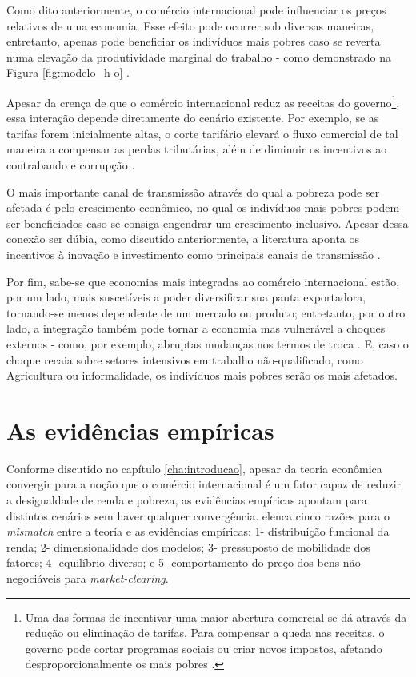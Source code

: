 Como dito anteriormente, o comércio internacional pode influenciar os preços relativos de uma economia. Esse efeito pode ocorrer sob diversas maneiras, entretanto, apenas pode beneficiar os indivíduos mais pobres caso se reverta numa elevação da produtividade marginal do trabalho - como demonstrado na Figura \ref{fig:modelo_h-o} \cite{bannisterthugge01}.

Apesar da crença de que o comércio internacional reduz as receitas do governo\footnote{Uma das formas de incentivar uma maior abertura comercial se dá através da redução ou eliminação de tarifas. Para compensar a queda nas receitas, o governo pode cortar programas sociais ou criar novos impostos, afetando desproporcionalmente os mais pobres \cite{bannisterthugge01}.}, essa interação depende diretamente do cenário existente. Por exemplo, se as tarifas forem inicialmente altas, o corte tarifário elevará o fluxo comercial de tal maneira a compensar as perdas tributárias, além de diminuir os incentivos ao contrabando e corrupção \cite{bannisterthugge01}.

O mais importante canal de transmissão através do qual a pobreza pode ser afetada é pelo crescimento econômico, no qual os indivíduos mais pobres podem ser beneficiados caso se consiga engendrar um crescimento inclusivo. Apesar dessa conexão ser dúbia, como discutido anteriormente, a literatura aponta os incentivos à inovação e investimento como principais canais de transmissão \cite{melitz21}.

Por fim, sabe-se que economias mais integradas ao comércio internacional estão, por um lado, mais suscetíveis a poder diversificar sua pauta exportadora, tornando-se menos dependente de um mercado ou produto; entretanto, por outro lado, a integração também pode tornar a economia mas vulnerável a choques externos - como, por exemplo, abruptas mudanças nos termos de troca \cite{bannisterthugge01}. E, caso o choque recaia sobre setores intensivos em trabalho não-qualificado, como Agricultura ou informalidade, os indivíduos mais pobres serão os mais afetados.


\section{As evidências empíricas} \label{sec:evidencias_empiricas}

Conforme discutido no capítulo \ref{cha:introducao}, apesar da teoria econômica convergir para a noção que o comércio internacional é um fator capaz de reduzir a desigualdade de renda e pobreza, as evidências empíricas apontam para distintos cenários sem haver qualquer convergência. \textcite{winters02} elenca cinco razões para o \textit{mismatch} entre a teoria e as evidências empíricas: 1- distribuição funcional da renda; 2- dimensionalidade dos modelos; 3- pressuposto de mobilidade dos fatores; 4- equilíbrio diverso; e 5- comportamento do preço dos bens não negociáveis para \textit{market-clearing}.

